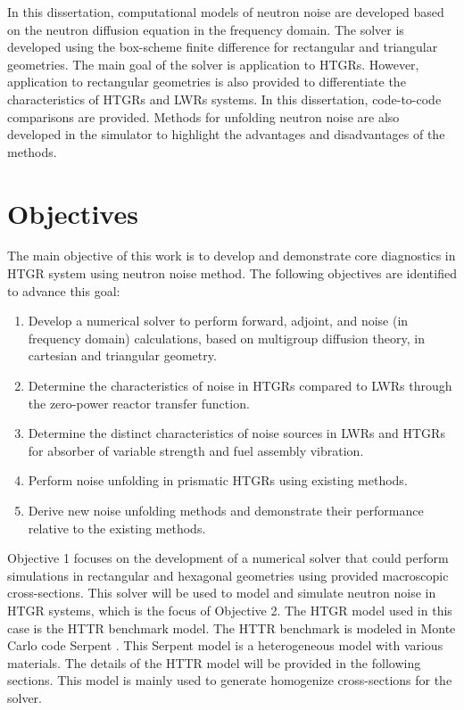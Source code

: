 In this dissertation, computational models of neutron noise are developed based on the neutron diffusion equation in the frequency domain. The solver is developed using the box-scheme finite difference for rectangular and triangular geometries. The main goal of the solver is application to \glspl*{HTGR}. However, application to rectangular geometries is also provided to differentiate the characteristics of \glspl*{HTGR} and \glspl*{LWR} systems. In this dissertation, code-to-code comparisons are provided. Methods for unfolding neutron noise are also developed in the simulator to highlight the advantages and disadvantages of the methods. 

\section{Objectives}

The main objective of this work is to develop and demonstrate core diagnostics in HTGR system using neutron noise method. The following objectives are identified to advance this goal:
\begin{enumerate}
    \item Develop a numerical solver to perform forward, adjoint, and noise (in frequency domain) calculations, based on multigroup diffusion theory, in cartesian and triangular geometry.
    \item Determine the characteristics of noise in HTGRs compared to LWRs through the zero-power reactor transfer function.
    \item Determine the distinct characteristics of noise sources in LWRs and HTGRs for absorber of variable strength and fuel assembly vibration.
    \item Perform noise unfolding in prismatic HTGRs using existing methods.
    \item Derive new noise unfolding methods and demonstrate their performance relative to the existing methods.
\end{enumerate}

Objective 1 focuses on the development of a numerical solver that could perform simulations in rectangular and hexagonal geometries using provided macroscopic cross-sections. This solver will be used to model and simulate neutron noise in HTGR systems, which is the focus of Objective 2. The HTGR model used in this case is the HTTR benchmark model. The HTTR benchmark is modeled in Monte Carlo code Serpent \cite{leppanenSerpentMonteCarlo2015}. This Serpent model is a heterogeneous model with various materials. The details of the HTTR model will be provided in the following sections. This model is mainly used to generate homogenize cross-sections for the solver. 

